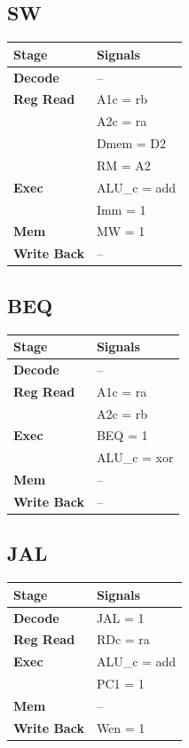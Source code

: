 \documentclass{article}
\begin{document}
\subsection*{SW}
\begin{tabular}{|l|l|}
\hline
\textbf{Stage} & \textbf{Signals}\\
\hline
\textbf{Decode} & --\\
\hline
\textbf{Reg Read} & A1c = rb\\
                  & A2c = ra\\
                  & Dmem = D2\\
                  & RM = A2\\
\hline
\textbf{Exec} & ALU\_c = add\\
              & Imm = 1\\
\hline
\textbf{Mem} & MW = 1\\
\hline
\textbf{Write Back} & -- \\
\hline
\end{tabular}

\subsection*{BEQ}
\begin{tabular}{|l|l|}
\hline
\textbf{Stage} & \textbf{Signals}\\
\hline
\textbf{Decode} & --\\
\hline
\textbf{Reg Read} & A1c = ra\\
                  & A2c = rb\\
\hline
\textbf{Exec} & BEQ = 1\\
              & ALU\_c = xor\\
\hline
\textbf{Mem} & --\\
\hline
\textbf{Write Back} & --\\
\hline
\end{tabular}


\subsection*{JAL}
\begin{tabular}{|l|l|}
\hline
\textbf{Stage} & \textbf{Signals}\\
\hline
\textbf{Decode} & JAL = 1\\
\hline
\textbf{Reg Read} & RDc = ra\\
\hline
\textbf{Exec} & ALU\_c = add\\
              & PC1 = 1\\
\hline
\textbf{Mem} & --\\
\hline
\textbf{Write Back} & Wen = 1\\
\hline
\end{tabular}
\end{document}
